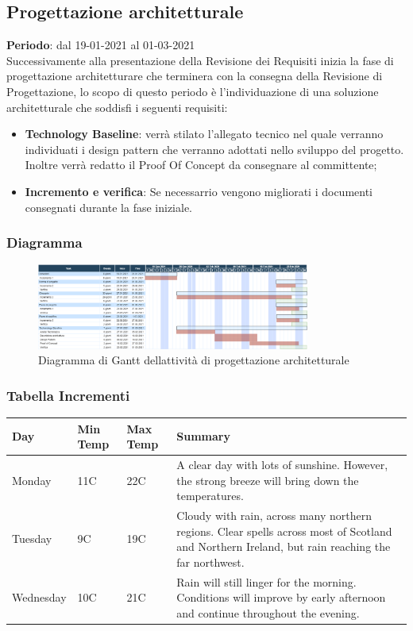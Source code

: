 	\subsection{Progettazione architetturale}
	\textbf{Periodo}: dal 19-01-2021 al 01-03-2021 \\
	Successivamente alla presentazione della Revisione dei Requisiti inizia la fase di progettazione architetturare che terminera con la consegna della Revisione di Progettazione, lo scopo di questo periodo è l'individuazione di una soluzione architetturale che soddisfi i seguenti requisiti:
	\begin{itemize}
		\item \textbf{Technology Baseline}: verrà stilato l'allegato tecnico nel quale verranno individuati i design pattern che verranno adottati nello sviluppo del progetto. Inoltre verrà redatto il Proof Of Concept da consegnare al committente;
		\item \textbf{Incremento e verifica}: Se necessarrio vengono migliorati i documenti consegnati durante la fase iniziale.
	\end{itemize}
	
	\subsubsection{Diagramma}
		\begin{figure}[H]
        		\centering
        		\includegraphics[width=0.8\textwidth]{source/img/Progettazione_architetturale.png}
        		\caption{Diagramma di Gantt dell\textquotesingle attività di progettazione architetturale}
    		\end{figure}
	\subsubsection{Tabella Incrementi}
		\begin{center}
    			\begin{tabular}{ | l | l | l | p{5cm} |}
   			 \hline
    			Day & Min Temp & Max Temp & Summary \\ \hline
    			Monday & 11C & 22C & A clear day with lots of sunshine.  
    			However, the strong breeze will bring down the temperatures. \\ \hline
    			Tuesday & 9C & 19C & Cloudy with rain, across many northern regions. Clear spells 
    			across most of Scotland and Northern Ireland, 
    			but rain reaching the far northwest. \\ \hline
    			Wednesday & 10C & 21C & Rain will still linger for the morning. 
   			 Conditions will improve by early afternoon and continue 
    			throughout the evening. \\
    			\hline
    			\end{tabular}
			\end{center}


